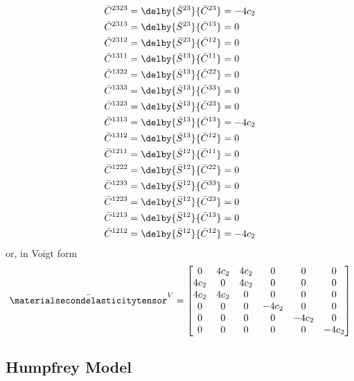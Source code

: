 \begin{equation}
\begin{split}
    \bar{C}^{2323}&=\delby{\bar{S}^{23}}{\bar{C}^{23}}=-4c_{2}\\
    \bar{C}^{2313}&=\delby{\bar{S}^{23}}{\bar{C}^{13}}=0\\
    \bar{C}^{2312}&=\delby{\bar{S}^{23}}{\bar{C}^{12}}=0\\
    \bar{C}^{1311}&=\delby{\bar{S}^{13}}{\bar{C}^{11}}=0\\
    \bar{C}^{1322}&=\delby{\bar{S}^{13}}{\bar{C}^{22}}=0\\
    \bar{C}^{1333}&=\delby{\bar{S}^{13}}{\bar{C}^{33}}=0\\
    \bar{C}^{1323}&=\delby{\bar{S}^{13}}{\bar{C}^{23}}=0\\
    \bar{C}^{1313}&=\delby{\bar{S}^{13}}{\bar{C}^{13}}=-4c_{2}\\
    \bar{C}^{1312}&=\delby{\bar{S}^{13}}{\bar{C}^{12}}=0\\
    \bar{C}^{1211}&=\delby{\bar{S}^{12}}{\bar{C}^{11}}=0\\
    \bar{C}^{1222}&=\delby{\bar{S}^{12}}{\bar{C}^{22}}=0\\
    \bar{C}^{1233}&=\delby{\bar{S}^{12}}{\bar{C}^{33}}=0\\
    \bar{C}^{1223}&=\delby{\bar{S}^{12}}{\bar{C}^{23}}=0\\
    \bar{C}^{1213}&=\delby{\bar{S}^{12}}{\bar{C}^{13}}=0\\
    \bar{C}^{1212}&=\delby{\bar{S}^{12}}{\bar{C}^{12}}=-4c_{2}\\
  \end{split}
\end{equation}
or, in Voigt form
\begin{equation}
  \bar{\materialsecondelasticitytensor}^{V}=\begin{bmatrix}
  0 & 4c_{2} & 4c_{2} & 0 & 0 & 0 \\
  4c_{2} & 0 & 4c_{2} & 0 & 0 & 0 \\
  4c_{2} & 4c_{2} & 0 & 0 & 0 & 0 \\
  0     & 0      & 0 & -4c_{2} & 0 & 0 \\
  0     & 0      & 0 & 0      & -4c_{2} & 0 \\
  0     & 0      & 0 & 0      & 0      & -4c_{2} 
  \end{bmatrix}
\end{equation}

\subsection{Humpfrey Model}

